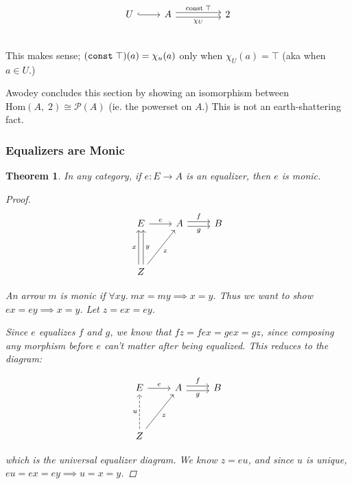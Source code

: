\documentclass[]{article}
\newtheorem{theorem}{Theorem}
\renewcommand{\hom}[2]{\ensuremath{\text{Hom}(#1,\;#2)}}
\newcommand{\tfarr}[4][\to]{\ensuremath{#2 : #3 #1 #4}}
\begin{document}
$$\begin{tikzcd}
  U\arrow[hookrightarrow]{r} & A \arrow[shift right=1,swap]{rr}{\chi_U}
  \arrow[shift left=1]{rr}{\text{const}\;\top} &  & 2 \\
\end{tikzcd}$$

This makes sense; $(\text{\texttt{const}}\;\top)(a) = \chi_u(a)$ only when
$\chi_U(a) = \top$ (aka when $a \in U$.)

Awodey concludes this section by showing an isomorphism between $\hom{A}{2}
\cong \mathcal{P}(A)$ (ie. the powerset on $A$.) This is not an earth-shattering
fact.

\subsubsection{Equalizers are Monic}

\begin{theorem}
  In any category, if \tfarr{e}{E}{A} is an equalizer, then $e$ is monic.

  \begin{proof}
$$\begin{tikzcd}
  E\arrow{r}{e} & A \arrow[shift right=1,swap]{r}{g} \arrow[shift left=1]{r}{f} & B \\
  & & \\
  Z \arrow[shift left=1]{uu}{x} \arrow[shift right=1,swap]{uu}{y} \arrow[swap]{uur}{z} & &
\end{tikzcd}$$

  An arrow $m$ is monic if $\forall x y.\; mx = my \implies x = y $. Thus we
  want to show $ex = ey \implies x = y$. Let $z = ex = ey$.

  Since $e$ equalizes $f$ and $g$, we know that $fz = fex = gex = gz$, since
  composing any morphism before $e$ can't matter after being equalized. This
  reduces to the diagram:

$$\begin{tikzcd}
  E\arrow{r}{e} & A \arrow[shift right=1,swap]{r}{g} \arrow[shift left=1]{r}{f} & B \\
  & & \\
  Z \arrow[dashed]{uu}{u}  \arrow[swap]{uur}{z} & &
\end{tikzcd}$$

  which is the universal equalizer diagram. We know $z = eu$, and since $u$ is
  unique, $eu = ex = ey \implies u = x = y$.
  \end{proof}
\end{theorem}
\end{document}
